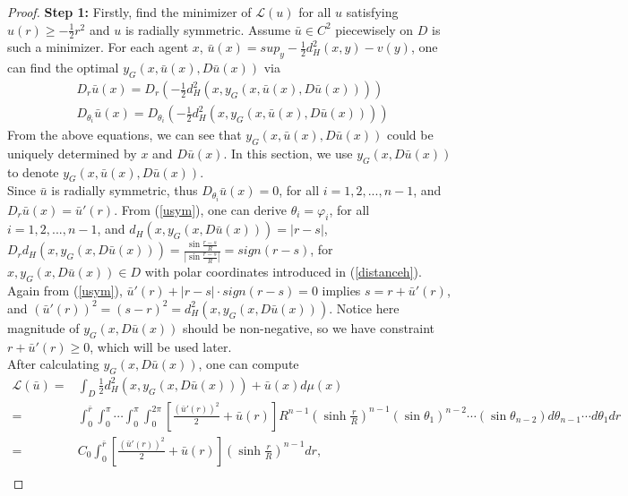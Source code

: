 \begin{proof}
	{\bf Step 1:} Firstly, find the minimizer of $\mathcal{L}(u)$ for all $u$ satisfying $u(r)\ge -\frac{1}{2}r^2$ and $u$ is radially symmetric. Assume $\bar{u} \in C^2$ piecewisely on $D$ is such a minimizer. For each agent $x$, $\bar{u}(x)= sup_{y} -\frac{1}{2}d_H^2(x,y)-v(y)$, one can find the optimal $y_G(x, \bar{u}(x), D\bar{u}(x))$ via
	\begin{equation}\label{usym}
	\begin{split}
	D_r\bar{u}(x) = D_r(-\frac{1}{2} d_H^2(x, y_G(x, \bar{u}(x), D\bar{u}(x))))\\
	D_{\theta_i}\bar{u}(x) = D_{\theta_i}(-\frac{1}{2} d_H^2(x, y_G(x, \bar{u}(x), D\bar{u}(x))))
	\end{split}
	\end{equation}
	From the above equations, we can see that $y_G(x, \bar{u}(x), D\bar{u}(x))$ could be uniquely determined by $x$ and $D\bar{u}(x)$. In this section, we use $y_G(x, D\bar{u}(x))$ to denote $y_G(x, \bar{u}(x), D\bar{u}(x))$.	\\
	Since $\bar{u}$ is radially symmetric, thus $D_{\theta_i} \bar{u}(x) =0 $, for all $i=1,2,...,n-1$, and $D_r\bar{u}(x)= \bar{u}'(r)$. From (\ref{usym}), one can derive $\theta_i = \varphi_i$, for all $i=1,2,...,n-1$, and $d_H(x, y_G(x, D\bar{u}(x))) = |r-s|$, $D_rd_H(x,y_G(x, D\bar{u}(x)))=\frac{\sin\frac{r-s}{R}}{|\sin\frac{r-s}{R}|}= sign(r-s) $, for $x, y_G(x, D\bar{u}(x)) \in D$ with polar coordinates introduced in (\ref{distanceh}).\\
	 Again from (\ref{usym}), $\bar{u}'(r)+|r-s|\cdot sign(r-s)=0$ implies $s=r+\bar{u}'(r)$, and $(\bar{u}'(r))^2 =(s-r)^2 = d_H^2(x, y_G(x, D\bar{u}(x)))$. Notice here magnitude of $y_G(x, D\bar{u}(x))$ should be non-negative, so we have constraint $r+\bar{u}'(r) \ge 0$, which will be used later. \\
	After calculating $y_G(x, D\bar{u}(x))$, one can compute
	\begin{equation*}
	\begin{split}
	\mathcal{L}(\bar{u})=& \int_D \frac{1}{2} d_H^2(x,y_G(x, D\bar{u}(x)))+\bar{u}(x) d\mu(x)\\
	=&\int_{0}^{\bar{r}}\int_{0}^{\pi}\cdots\int_{0}^{\pi}\int_{0}^{2\pi}[\frac{(\bar{u}'(r))^2}{2}+\bar{u}(r)]R^{n-1}(\sinh\frac{r}{R})^{n-1}(\sin \theta_1)^{n-2}\cdots (\sin\theta_{n-2}) d\theta_{n-1}\cdots d\theta_1 dr\\	
	=&C_0\int_{0}^{\bar{r}}[\frac{(\bar{u}'(r))^2}{2}+\bar{u}(r)] (\sinh\frac{r}{R})^{n-1} dr, \\

\end{split}
\end{equation*}
\end{proof}
